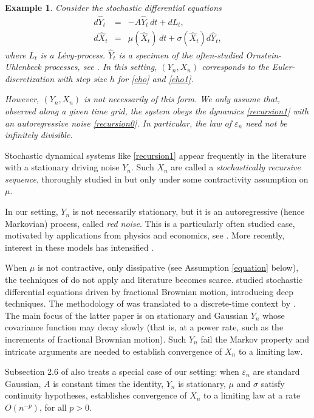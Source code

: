 \documentclass{article}
\newtheorem{example}[theorem]{Example}
\begin{document}
\begin{example}{\rm Consider the stochastic differential equations
\begin{eqnarray}
d\hat{Y}_t &=& -A\hat{Y}_t\, dt+dL_t,\label{eho}\\ 
d\hat{X}_t &=& \mu(\hat{X}_t)\, dt+\sigma(\hat{X}_t)d\hat{Y}_t,\label{eho1}
\end{eqnarray}
where $L_t$ is a L\'evy-process. $\hat{Y}_t$ is a specimen of the often-studied Ornstein-Uhlenbeck processes,
see \cite{ou}. In this setting, $(Y_n,X_n)$ corresponds to the Euler-discretization with
step size $h$ for \eqref{eho} and \eqref{eho1}.

However, $(Y_n,X_n)$ is not necessarily of this form. We only assume that, observed along a given time grid,
the system obeys the dynamics \eqref{recursion1} with an autoregressive noise \eqref{recursion0}. In
particular, the law of $\varepsilon_n$ need not be infinitely divisible.
}
\end{example}

Stochastic dynamical systems like \eqref{recursion1} appear frequently in
the literature with a stationary driving noise $Y_{n}$. 
Such $X_n$
are called a \emph{stochastically recursive sequence}, thoroughly studied in \cite{borovkov} but only
under some contractivity assumption on $\mu$. 

In our setting, $Y_n$ is not necessarily stationary, but it is an autoregressive (hence Markovian) process,
called \emph{red noise}. This is a particularly often studied case, motivated by applications
from physics and economics, see \cite{red1,starmer}. More recently, interest in these models has
intensified \cite{red2,red3,red5,red6,red7}.

When $\mu$ is not contractive, only dissipative (see Assumption \ref{equation} below), the techniques of \cite{borovkov}
do not apply and literature becomes scarce.
\cite{hairer-cont} studied stochastic differential equations driven
by fractional Brownian motion, introducing deep techniques.
The methodology of \cite{hairer-cont} was translated to a discrete-time context by \cite{varvenne}.
%
The main focus of the latter paper is on stationary and Gaussian $Y_{n}$ whose
covariance function may decay slowly (that is, at a power rate, such as the
increments of fractional Brownian motion). Such $Y_n$ fail the Markov property and intricate
arguments are needed to establish convergence of $X_{n}$ to a limiting law.

Subsection 2.6 of \cite{varvenne} also treats a special case of our setting: when $\varepsilon_n$
are standard Gaussian, $A$ is constant times the identity, $Y_n$ is stationary,
$\mu$ and $\sigma$ satisfy continuity hypotheses, \cite{varvenne}
establishes convergence of $X_{n}$ to a limiting law at a rate $O(n^{-p})$, for all $p>0$.
\end{document}

